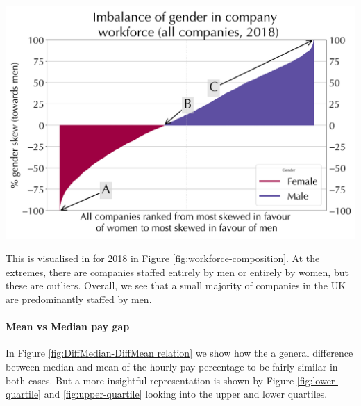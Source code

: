 \begin{centering}
    \includegraphics[width=\linewidth]{images/2018-all-companies-gender-makeup.png}
    \label{fig:workforce-composition}
\end{centering}
\justify

This is visualised in for 2018 in Figure \ref{fig:workforce-composition}. At the extremes, there are companies staffed entirely by men or entirely by women, but these are outliers. Overall, we see that a small majority of companies in the UK are predominantly staffed by men.

\paragraph{Mean vs Median pay gap}
    In Figure \ref{fig:DiffMedian-DiffMean relation} we show how the a general difference between median and mean of the hourly pay percentage to be fairly similar in both cases. But a more insightful representation is shown by Figure \ref{fig:lower-quartile} and \ref{fig:upper-quartile} looking into the upper and lower quartiles.

